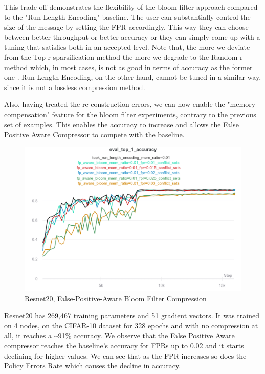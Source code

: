     This trade-off demonstrates the flexibility of the bloom filter approach compared to the "Run Length Encoding" baseline. 
    The user can substantially control the size of the message by setting the FPR accordingly. 
    This way they can choose between better throughput or better accuracy or they can simply come up with a tuning that satisfies both in an accepted level.
    Note that, the more we deviate from the Top-r sparsification method the more we degrade to the Random-r method which, in most cases, is not as good in terms of accuracy as the former one \cite{10754/662495}.
    Run Length Encoding, on the other hand, cannot be tuned in a similar way, since it is not a lossless compression method.
    
    Also, having treated the re-construction errors, we can now enable the "memory compensation" feature for the bloom filter experiments, contrary to the previous set of examples. 
    This enables the accuracy to increase and allows the False Positive Aware Compressor to compete with the baseline.
    
    \newpage
    
    \begin{figure}[h]
    \centering
    \includegraphics[width=1\textwidth]{figures/fp_aware_resnet20.png}
    \caption{Resnet20, False-Positive-Aware Bloom Filter Compression}
    \label{fpa-compression}
    \end{figure}

    \vspace{1cm}

    Resnet20 has 269,467 training parameters and 51 gradient vectors.
    It was trained on 4 nodes, on the CIFAR-10 dataset for 328 epochs and with no compression at all, it reaches a \textasciitilde91\% accuracy.
    We observe that the False Positive Aware compressor reaches the baseline's accuracy for FPRs up to 0.02 and it starts declining for higher values.
    We can see that as the FPR increases so does the Policy Errors Rate which causes the decline in accuracy.
    
